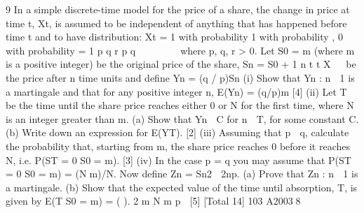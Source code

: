 \documentclass[a4paper,12pt]{article}
\begin{document}
\begin{enumerate}

9 In a simple discrete-time model for the price of a share, the change in price at time t, Xt, is assumed to be independent of anything that has happened before time t and to
have distribution:
Xt =
1 with probability
1 with probability ,
0 with probability = 1
p
q
r p q

 
  
where p, q, r > 0.
Let S0 = m (where m is a positive integer) be the original price of the share,
Sn = S0 + 1
n
t t X
  be the price after n time units and define
Yn = (q / p)Sn
(i)  Show that {Yn : n  1} is a martingale and that for any positive integer n,
E(Yn) = (q/p)m [4]
(ii)  Let T be the time until the share price reaches either 0 or N for the first time,
where N is an integer greater than m.
(a) Show that 
Yn
  C for n  T, for some constant C.
(b) Write down an expression for E(YT).
[2]
(iii) Assuming that p  q, calculate the probability that, starting from m, the share price reaches 0 before it reaches N, i.e. P(ST = 0 
S0 = m). [3]
(iv) In the case p = q you may assume that P(ST = 0 
S0 = m) = (Nm)/N. Now
define Zn = Sn2  2np.
(a) Prove that {Zn : n  1} is a martingale.
(b) Show that the expected value of the time until absorption, T, is given
by
E(T
S0 = m) = ( ).
2
m N m
p

[5]
[Total 14]
103 A20038


\end{enumerate}
\end{document}
